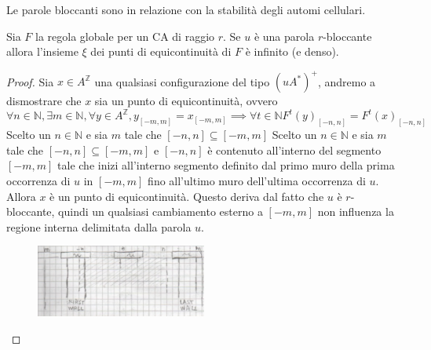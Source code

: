 Le parole bloccanti sono in relazione con la stabilità degli automi cellulari.
\begin{teorema}
    Sia $F$ la regola globale per un CA di raggio $r$. Se $u$ è una parola $r$-bloccante
    allora l'insieme $\xi$ dei punti di equicontinuità di $F$ è infinito (e denso).
    \begin{proof}
        Sia $x\in A^\mathbb{Z}$ una qualsiasi configurazione del tipo $(uA^\ast)^+$,
        andremo a dismostrare che $x$ sia un punto di equicontinuità, ovvero
        $$\forall n\in \mathbb{N} ,\exists m\in \mathbb{N} , \forall y\in A^\mathbb{Z}, y_{[-m,m]} = x_{[-m,m]} \implies \forall t\in \mathbb{N} F^t(y)_{[-n,n]}=F^t(x)_{[-n,n]}$$
        Scelto un $n \in \mathbb{N}$ e sia $m$ tale che $[-n,n]\subseteq [-m,m]$
        Scelto un $n \in \mathbb{N}$ e sia $m$ tale che $[-n,n]\subseteq [-m,m]$
        e $[-n,n]$ è contenuto all'interno del segmento $[-m,m]$ tale che
        inizi all'interno segmento definito dal primo muro della prima occorrenza di $u$ in $[-m,m]$ fino
        all'ultimo muro dell'ultima occorrenza di $u$. Allora $x$ è un punto di
        equicontinuità. Questo deriva dal fatto che $u$ è $r$-bloccante, quindi un
        qualsiasi cambiamento esterno a $[-m,m]$ non influenza la regione interna
        delimitata dalla parola $u$.
        \begin{figure}[!h]
            \centering
            \includegraphics[width=0.5\textwidth]{img/sistemi_complessi/blocking_word_2.png}
        \end{figure}
    \end{proof}
\end{teorema}
